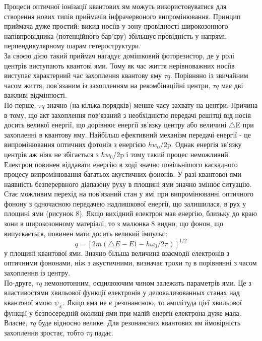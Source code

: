 \documentclass[a4paper,14pt]{extreport}
\begin{document}
\newpage


 

 

Процеси оптичної іонізації квантових ям можуть використовуватися для створення нових типів приймачів інфрачервоного випромінювання. Принцип приймача дуже простий: викид носіїв у зону провідності широкозонного напівпровідника (потенційного бар'єру) збільшує провідність у напрямі, перпендикулярному шарам гетероструктури.\\

За своєю дією такий приймач нагадує домішковий фоторезистор, де у ролі центрів виступають квантові ями. Тому як час життя нерівноважних носіїв виступає характерний час захоплення квантову яму $\tau q$. Порівняно із звичайним часом життя, пов'язаним із захопленням на рекомбінаційні центри, $\tau q$ має дві важливі відмінності.\\

По-перше, $\tau q$ значно (на кілька порядків) менше часу захвату на центри. Причина в тому, що акт захоплення пов'язаний з необхідністю передачі решітці від носія досить великої енергії, що дорівнює енергії зв'язку центру або величині $\triangle$E при захопленні в квантову яму. Найбільш ефективний механізм передачі енергії - це випромінювання оптичних фотонів з енергією $hw_0$/2p. Однак енергія зв'язку центрів аж ніяк не збігається з $hw_0$/2p і тому такий процес неможливий. Електрон повинен віддавати енергію в ході значно повільнішого каскадного процесу випромінювання багатьох акустичних фононів. У разі квантової ями наявність безперервного діапазону руху в площині ями значно змінює ситуацію. Стає можливим перехід на пов'язаний стан у ямі при випромінюванні оптичного фонону з одночасною передачею надлишкової енергії, що залишилася, в рух у площині ями (рисунок 8). Якщо вихідний електрон мав енергію, близьку до краю зони в широкозонному матеріалі, то з малюнка 8 видно, що фонон, що випускається, повинен мати досить великий імпульс:\\
\[ q = [2m (\triangle E - E1 - h\omega_0/2\pi)]^{1/2}\]
у площині квантової ями. Значно більша величина
взаємодії електронів з оптичними фононами, ніж з
акустичними, визначає трохи $\tau q$ в порівнянні з часом
захоплення із центру.\\ 

По-друге, $\tau q$ немонотонним, осцилюючим чином залежить
параметрів ями. Це з властивостями хвильової функції електронів у делокализованных станах над квантової ямою $\psi_{\pounds}$.
Якщо яма не є резонансною, то амплітуда цієї хвильової
функції у безпосередній околиці ями при малій енергії
електрона дуже мала. Власне, $\tau q$ буде відносно велике. Для
резонансних квантових ям ймовірність захоплення зростає, тобто $\tau q$
падає.\\ 
\end{document}
